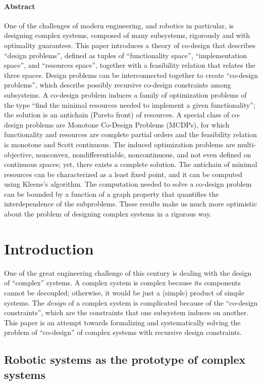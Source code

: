 
\paragraph{Abstract}
One of the challenges of modern engineering, and robotics in particular,
is designing complex systems, composed of many subsystems, rigorously
and with optimality guarantees. This paper introduces a theory of
co-design that describes ``design problems'', defined as tuples
of ``functionality space'', ``implementation space'', and ``resources
space'', together with a feasibility relation that relates the three
spaces. Design problems can be interconnected together to create ``co-design
problems'', which describe possibly recursive co-design constraints
among subsystems. A co-design problem induces a family of optimization
problems of the type ``find the minimal resources needed to implement
a given functionality''; the solution is an antichain (Pareto front)
of resources. A special class of co-design problems are Monotone Co-Design
Problems (MCDPs), for which functionality and resources are complete
partial orders and the feasibility relation is monotone and Scott
continuous. The induced optimization problems are multi-objective,
nonconvex, nondifferentiable, noncontinuous, and not even defined
on continuous spaces; yet, there exists a complete solution. The antichain
of minimal resources can be characterized as a least fixed point,
and it can be computed using Kleene's algorithm. The computation needed
to solve a co-design problem can be bounded by a function of a graph
property that quantifies the interdependence of the subproblems. These
results make us much more optimistic about the problem of designing
complex systems in a rigorous way.

\section{Introduction}
One of the great engineering challenge of this
century is dealing with the design of ``complex'' systems. A complex
system is complex because its components cannot be decoupled; otherwise,
it would be just a (simple) product of simple systems. The \emph{design}
of a complex system is complicated because of the ``co-design constraints'',
which are the constraints that one subsystem induces on another. This
paper is an attempt towards formalizing and systematically solving
the problem of ``co-design'' of complex systems with recursive design
constraints.

\subsection{Robotic systems as the prototype of complex systems}

